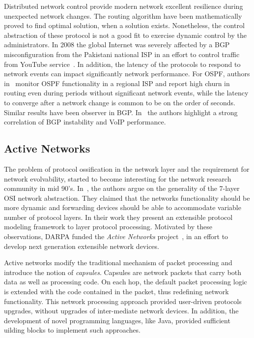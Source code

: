 Distributed network control provide modern network excellent resilience during
unexpected network changes. The routing algorithm have been mathematically
proved to find optimal solution, when a solution exists. Nonetheless, the
control abstraction of these protocol is not a good fit to exercise
dynamic control by the administrators. In 2008 the global Internet was severely
affected by a BGP misconfiguration from the Pakistani national
ISP in an effort to control traffic from YouTube service~\cite{bgp_config_error}. 
In addition, the latency of the protocols
to respond to network events can impact significantly network performance.
For OSPF, authors in~\cite{Watson2003} monitor OSPF
functionality in a regional ISP and report high churn in routing even during
periods without significant network events, while the latency to converge after
a network change is common to be on the order of seconds. Similar results have
been observer in BGP. In~\cite{Kushman2007} the authors highlight a strong 
correlation of BGP instability and VoIP performance. 

\subsection{Active Networks}

The problem of protocol ossification in the network layer and the requirement
for network evolvability, started to become interesting for the network research
community
in mid 90's. In~\cite{O'Malley1992}, the authors argue on the generality of the
7-layer OSI network abstraction. They claimed that the networks functionality
should be more dynamic and forwarding devices should be able to accommodate
variable number of protocol layers. In their work they present an extensible protocol
modeling framework to layer protocol processing. Motivated by these observations, DARPA
funded the {\it Active Networks} project~\cite{darpa_active_net}, in an effort
to develop next generation extensible network devices. 

Active networks modify the traditional mechanism of packet processing and
introduce the notion of {\it capsules}. Capsules are network packets that carry both data
as well as processing code. On each hop, the default packet
processing logic is extended with the code contained in the packet, thus
redefining network functionality. This network processing approach provided
user-driven protocols upgrades, without upgrades of 
inter-mediate network devices.  In addition, the development of novel
programming languages, like Java, provided sufficient uilding blocks to implement such
approaches.  

